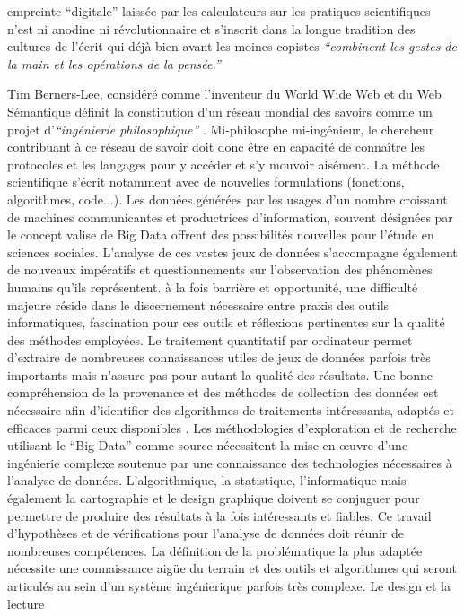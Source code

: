 empreinte {\textquotedblleft}digitale{\textquotedblright} laissée par les calculateurs sur les pratiques scientifiques n{\textquoteright}est ni anodine ni révolutionnaire et s{\textquoteright}inscrit dans la longue tradition des cultures de l{\textquoteright}écrit qui déjà bien avant les moines copistes \textit{{\textquotedblleft}combinent les gestes de la main et les opérations de la pensée.{\textquotedblright}} \citep{Jacob2011}  

Tim Berners-Lee, considéré comme l{\textquoteright}inventeur du World Wide Web et du Web Sémantique définit la constitution d{\textquoteright}un réseau mondial des savoirs comme un projet d{\textquoteright}\textit{{\textquotedblleft}ingénierie philosophique{\textquotedblright} }\citep{Halpin2014}. Mi-philosophe mi-ingénieur, le chercheur contribuant à ce réseau de savoir doit donc \^etre en capacité de conna\^itre les protocoles et les langages pour y accéder et s{\textquoteright}y mouvoir aisément. La méthode scientifique s{\textquoteright}écrit notamment avec de nouvelles formulations (fonctions, algorithmes, code...). Les données générées par les usages d{\textquoteright}un nombre croissant de machines communicantes et productrices d{\textquoteright}information, souvent désignées par le concept {\guillemotleft} valise {\guillemotright} de Big Data \citep{Lohr2012} offrent des possibilités nouvelles pour l{\textquoteright}étude en sciences sociales. L{\textquoteright}analyse de ces vastes jeux de données s{\textquoteright}accompagne également de nouveaux impératifs et questionnements sur l{\textquoteright}observation des phénomènes humains qu{\textquoteright}ils représentent. à la fois barrière et opportunité, une difficulté majeure réside dans le discernement nécessaire entre praxis des outils informatiques, fascination pour ces outils et réflexions pertinentes sur la qualité des méthodes employées. Le traitement quantitatif par ordinateur permet d{\textquoteright}extraire de nombreuses connaissances utiles de jeux de données parfois très importants mais n{\textquoteright}assure pas pour autant la qualité des résultats. Une bonne compréhension de la provenance et des méthodes de collection des données est nécessaire afin d{\textquoteright}identifier des algorithmes de traitements intéressants, adaptés et efficaces parmi ceux disponibles \citep{Rajaraman2011}. Les méthodologies d{\textquoteright}exploration et de recherche utilisant le {\textquotedblleft}Big Data{\textquotedblright} comme source nécessitent la mise en {\oe}uvre d{\textquoteright}une ingénierie complexe soutenue par une connaissance des technologies nécessaires à l{\textquoteright}analyse de données. L{\textquoteright}algorithmique, la statistique, l{\textquoteright}informatique mais également la cartographie et le design graphique doivent se conjuguer pour permettre de produire des résultats à la fois intéressants et fiables. Ce travail d{\textquoteright}hypothèses et de vérifications pour l{\textquoteright}analyse de données doit réunir de nombreuses compétences. La définition de la problématique la plus adaptée nécessite une connaissance aig\"ue du terrain et des outils et algorithmes qui seront articulés au sein d{\textquoteright}un système ingénierique parfois très complexe. Le design et la lecture 